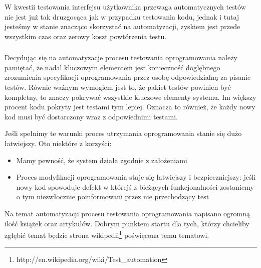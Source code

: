         W kwestii testowania interfejsu użytkownika przewaga automatycznych testów nie jest już tak druzgocąca jak w przypadku testowania kodu, jednak i tutaj jesteśmy w stanie znacząco skorzystać na automatyzacji, zyskiem jest przede wszystkim czas oraz zerowy koszt powtórzenia testu.
        
      \subsubsection{}

        Decydując się na automatyzacje procesu testowania oprogramowania należy pamiętać, że nadal kluczowym elementem jest konieczność dogłębnego zrozumienia specyfikacji oprogramowania przez osobę odpowiedzialną za pisanie testów. Równie ważnym wymogiem jest to, że pakiet testów powinien być kompletny, to znaczy pokrywać wszystkie kluczowe elementy systemu. Im większy procent kodu pokryty jest testami tym lepiej. Oznacza to również, że każdy nowy kod musi być dostarczony wraz z odpowiednimi testami.
        
        Jeśli spełnimy te warunki proces utrzymania oprogramowania stanie się dużo łatwiejszy. Oto niektóre z korzyści:
        
         \begin{itemize}
     	    \item Mamy pewność, że system działa zgodnie z założeniami
     	    \item Proces modyfikacji oprogramowania staje się łatwiejszy i bezpieczniejszy: jeśli nowy kod spowoduje defekt w którejś z bieżących funkcjonalności zostaniemy o tym niezwłocznie poinformowani przez nie przechodzący test
     	  \end{itemize}
     	  
     	  Na temat automatyzacji procesu testowania oprogramowania napisano ogromną ilość książek oraz artykułów. Dobrym punktem startu dla tych, którzy chcieliby zgłębić temat będzie strona wikipedii\footnote{http://en.wikipedia.org/wiki/Test\_automation} \nocite{wiki_test_automation} poświęcona temu tematowi.

